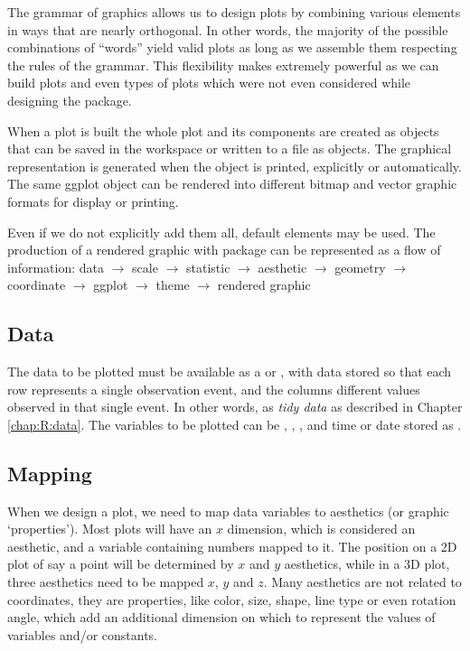 \documentclass[krantz2]{krantz}\usepackage{knitr}%
\begin{document}
The grammar of graphics allows us to design plots by combining various elements in ways that are nearly orthogonal. In other words, the majority of the possible combinations of ``words'' yield valid plots as long as we assemble them respecting the rules of the grammar. This flexibility makes \ggplot extremely powerful as we can build plots and even types of plots which were not even considered while designing the \ggplot package.

When a plot is built the whole plot and its components are created as \Rlang objects that can be saved in the workspace or written to a file as objects. The graphical representation is generated when the object is printed, explicitly or automatically. The same ggplot object can be rendered into different bitmap and vector graphic formats for display or printing.

Even if we do not explicitly add them all, default elements may be used. The production of a rendered graphic with package  can be represented as a flow of information:
\textsf{data $\to$ scale $\to$ statistic $\to$ aesthetic $\to$ geometry $\to$ coordinate $\to$ ggplot $\to$ theme $\to$ rendered graphic}

\subsection{Data}

The data to be plotted must be available as a  or , with data stored so that each row represents a single observation event, and the columns different values observed in that single event. In other words, as \emph{tidy data} as described in Chapter \ref{chap:R:data}. The variables to be plotted can be , , , and time or date stored as .

\subsection{Mapping}

When we design a plot, we need to map data variables to aesthetics (or graphic `properties'). Most plots will have an $x$ dimension, which is considered an aesthetic, and a variable containing numbers mapped to it. The position on a 2D plot of say a point will be determined by $x$ and $y$ aesthetics, while in a 3D plot, three aesthetics need to be mapped $x$, $y$ and $z$. Many aesthetics are not related to coordinates, they are properties, like color, size, shape, line type or even rotation angle, which add an additional dimension on which to represent the values of variables and/or constants.
\end{document}
